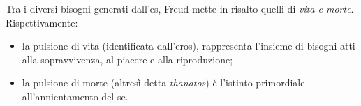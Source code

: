 \documentclass{subfiles}
\begin{document}
Tra i diversi bisogni generati dall'es, Freud mette in risalto quelli di \emph{vita \emph{e} morte}.
Rispettivamente:
\begin{itemize}
    \item la pulsione di vita (identificata dall'eros), rappresenta l'insieme di bisogni atti alla sopravvivenza, al piacere e alla riproduzione;
    \item la pulsione di morte (altresì detta \emph{thanatos}) è l'istinto primordiale all'annientamento del se.
\end{itemize}
\end{document}
